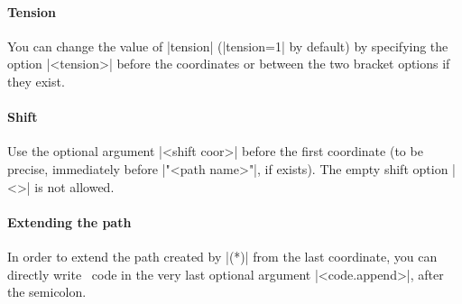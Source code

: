\paragraph{Tension}
You can change the value of |tension| (|tension=1| by default) by specifying the option |{<tension>}| before the coordinates or between the two bracket options if they exist.

\begin{tzcode}{.3}
\end{tzcode}


\paragraph{Shift} Use the optional argument |<shift coor>| before the first coordinate (to be precise, immediately before |"<path name>"|, if exists).
The empty shift option |<>| is not allowed.

\begin{tzcode}{.3}
\end{tzcode}


\paragraph{Extending the path} In order to extend the path created by |\tzplotcurve(*)| from the last coordinate, you can directly write \Tikz\ code in the very last optional argument |<code.append>|, after the semicolon.

\begin{tzcode}{.3}
\end{tzcode}

